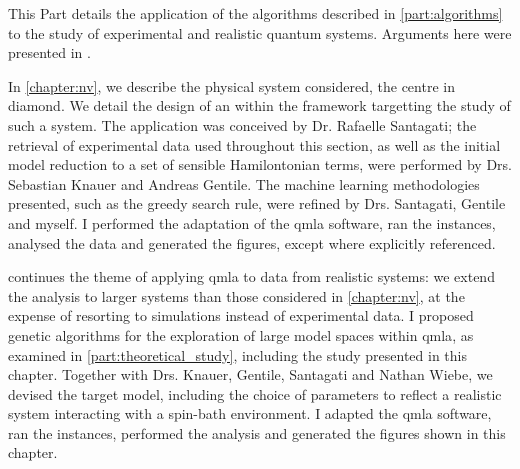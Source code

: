 This Part details the application of the algorithms described in \cref{part:algorithms}
    to the study of experimental and realistic quantum systems.
Arguments here were presented in \cite{gentile2020learning}. 
\par 
\vspace{1cm}

In \cref{chapter:nv}, we describe the physical system considered, 
    the  centre in diamond. 
We detail the design of an  within the  framework
    targetting the study of such a system. 
The application was conceived by Dr. Rafaelle Santagati; 
    the retrieval of experimental data used throughout this section, 
    as well as the initial model reduction to a set of sensible Hamilontonian terms,
    were performed by Drs. Sebastian Knauer and Andreas Gentile. 
The machine learning methodologies presented, 
    such as the greedy search rule, were refined by Drs. Santagati, Gentile and myself. 
I performed the adaptation of the \gls{qmla} software, 
    ran the instances, analysed the data and generated the figures, except where explicitly referenced.
\par 
\vspace{1cm}

 continues the theme of applying \gls{qmla} to data from realistic systems: 
    we extend the analysis to larger systems than those considered in \cref{chapter:nv}, 
    at the expense of resorting to simulations instead of experimental data. 
I proposed genetic algorithms for the exploration of large model spaces within \gls{qmla}, 
    as examined in \cref{part:theoretical_study}, including the study presented in this chapter. 
Together with Drs. Knauer, Gentile, Santagati and Nathan Wiebe, we devised the target model, 
    including the choice of parameters to reflect a realistic system 
    interacting with a spin-bath environment.
I adapted the \gls{qmla} software, ran the instances, performed the analysis and generated the figures 
    shown in this chapter. 


